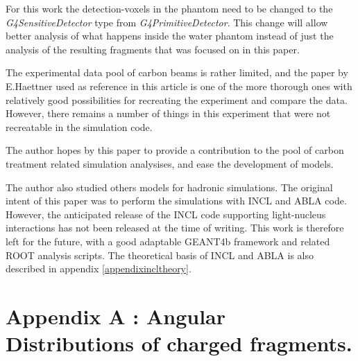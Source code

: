 For this work the detection-voxels in the phantom need to be changed to the \textit{G4SensitiveDetector} type from \textit{G4PrimitiveDetector}. This change will allow better analysis of what happens inside the water phantom instead of just the analysis of the resulting fragments that was focused on in this paper.

The experimental data pool of carbon beams is rather limited, and the paper by E.Haettner used as reference in this article is one of the more thorough ones with relatively good possibilities for recreating the experiment and compare the data. However, there remains a number of things in this experiment that were not recreatable in the simulation code.

The author hopes by this paper to provide a contribution to the pool of carbon treatment related simulation analysises, and ease the development of models.

The author also studied others models for hadronic simulations. The original intent of this paper was to perform the simulations with INCL and ABLA code. However, the anticipated release of the INCL code supporting light-nucleus interactions has not been released at the time of writing. This work is therefore left for the future, with a good adaptable GEANT4b framework and related ROOT analysis scripts. The theoretical basis of INCL and ABLA is also described in appendix \ref{appendixincltheory}.

\clearpage

  

\appendix 

\clearpage
{}
\section*{Appendix A \label{AppendixA}: Angular Distributions of charged fragments.\label{AngularDistributionAppendix}}

\renewcommand{\theequation}{A\arabic{equation}}
\setcounter{equation}{0}  
\renewcommand{\thefigure}{A\arabic{figure}}
\setcounter{figure}{0}
\renewcommand{\thetable}{A\arabic{table}}
\setcounter{table}{0}
\renewcommand\thesection{A}
\setcounter{section}{1}

